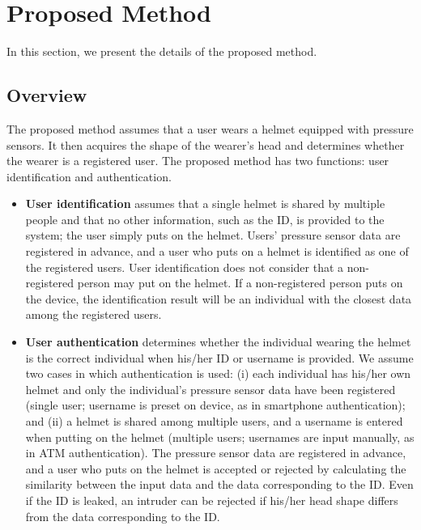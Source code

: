 \documentclass[english,preprint,JIP]{ipsj}
\begin{document}
\section{Proposed Method}
\label{sec:method}
In this section, we present the details of the proposed method.


\subsection{Overview}
The proposed method assumes that a user wears a helmet equipped with pressure sensors. It then acquires the shape of the wearer's head and determines whether the wearer is a registered user. The proposed method has two functions: user identification and authentication.
\begin{itemize}
    \item {\bf User identification} assumes that a single helmet is shared by multiple people and that no other information, such as the ID, is provided to the system; the user simply puts on the helmet. Users' pressure sensor data are registered in advance, and a user who puts on a helmet is identified as one of the registered users. User identification does not consider that a non-registered person may put on the helmet. If a non-registered person puts on the device, the identification result will be an individual with the closest data among the registered users.

    \item {\bf User authentication} determines whether the individual wearing the helmet is the correct individual when his/her ID or username is provided. We assume two cases in which authentication is used: (i) each individual has his/her own helmet and only the individual's pressure sensor data have been registered (single user; username is preset on device, as in smartphone authentication); and (ii) a helmet is shared among multiple users, and a username is entered when putting on the helmet (multiple users; usernames are input manually, as in ATM authentication). The pressure sensor data are registered in advance, and a user who puts on the helmet is accepted or rejected by calculating the similarity between the input data and the data corresponding to the ID. Even if the ID is leaked, an intruder can be rejected if his/her head shape differs from the data corresponding to the ID.
\end{itemize}
\end{document}
